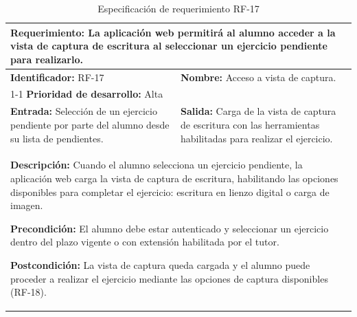 \begin{table}[H]
\caption{Especificación de requerimiento RF-17}
\centering
\renewcommand{\arraystretch}{1.3}
\setlength{\tabcolsep}{6pt}
\begin{tabular}{|p{7cm}|p{8cm}|}
\hline
\multicolumn{2}{|p{15cm}|}{\textbf{Requerimiento:} La aplicación web permitirá al alumno acceder a la vista de captura de escritura al seleccionar un ejercicio pendiente para realizarlo.} \\ \hline
\textbf{Identificador:} RF-17 &
\textbf{Nombre:} Acceso a vista de captura. \\ \cline{1-1}
\textbf{Prioridad de desarrollo:} Alta &
\multicolumn{1}{p{8cm}|}{} \\ \hline
\textbf{Entrada:} Selección de un ejercicio pendiente por parte del alumno desde su lista de pendientes. &
\textbf{Salida:} Carga de la vista de captura de escritura con las herramientas habilitadas para realizar el ejercicio. \\ \hline
\multicolumn{2}{|p{15cm}|}{
\textbf{Descripción:} Cuando el alumno selecciona un ejercicio pendiente, la aplicación web carga la vista de captura de escritura, habilitando las opciones disponibles para completar el ejercicio: escritura en lienzo digital o carga de imagen.

\vspace{0.2cm}
\textbf{Precondición:} El alumno debe estar autenticado y seleccionar un ejercicio dentro del plazo vigente o con extensión habilitada por el tutor.

\vspace{0.2cm}
\textbf{Postcondición:} La vista de captura queda cargada y el alumno puede proceder a realizar el ejercicio mediante las opciones de captura disponibles (RF-18).
} \\ \hline
\end{tabular}
\label{tab:rf17}
\end{table}


